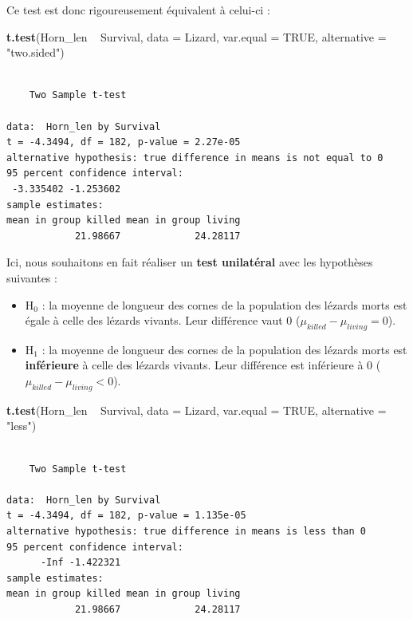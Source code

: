 \documentclass[a4paperpaper,]{article}
\newenvironment{Shaded}{\begin{snugshade}}{\end{snugshade}}
\newcommand{\DataTypeTok}[1]{\textcolor[rgb]{0.00,0.34,0.68}{#1}}
\newcommand{\KeywordTok}[1]{\textcolor[rgb]{0.12,0.11,0.11}{\textbf{#1}}}
\newcommand{\NormalTok}[1]{\textcolor[rgb]{0.12,0.11,0.11}{#1}}
\newcommand{\OperatorTok}[1]{\textcolor[rgb]{0.12,0.11,0.11}{#1}}
\newcommand{\OtherTok}[1]{\textcolor[rgb]{0.00,0.43,0.16}{#1}}
\newcommand{\StringTok}[1]{\textcolor[rgb]{0.75,0.01,0.01}{#1}}
\providecommand{\tightlist}{%
  \setlength{\itemsep}{0pt}\setlength{\parskip}{0pt}}
\begin{document}
Ce test est donc rigoureusement équivalent à celui-ci :

\begin{Shaded}
\begin{Highlighting}[]
\KeywordTok{t.test}\NormalTok{(Horn_len }\OperatorTok{~}\StringTok{ }\NormalTok{Survival, }
       \DataTypeTok{data =}\NormalTok{ Lizard, }\DataTypeTok{var.equal =} \OtherTok{TRUE}\NormalTok{,}
       \DataTypeTok{alternative =} \StringTok{"two.sided"}\NormalTok{)}
\end{Highlighting}
\end{Shaded}

\begin{verbatim}

    Two Sample t-test

data:  Horn_len by Survival
t = -4.3494, df = 182, p-value = 2.27e-05
alternative hypothesis: true difference in means is not equal to 0
95 percent confidence interval:
 -3.335402 -1.253602
sample estimates:
mean in group killed mean in group living 
            21.98667             24.28117 
\end{verbatim}

Ici, nous souhaitons en fait réaliser un \textbf{test unilatéral} avec les hypothèses suivantes :

\begin{itemize}
\tightlist
\item
  H\(_0\) : la moyenne de longueur des cornes de la population des lézards morts est égale à celle des lézards vivants. Leur différence vaut 0 (\(\mu_{killed}-\mu_{living} = 0\)).
\item
  H\(_1\) : la moyenne de longueur des cornes de la population des lézards morts est \textbf{inférieure} à celle des lézards vivants. Leur différence est inférieure à 0 (\(\mu_{killed}-\mu_{living} < 0\)).
\end{itemize}

\begin{Shaded}
\begin{Highlighting}[]
\KeywordTok{t.test}\NormalTok{(Horn_len }\OperatorTok{~}\StringTok{ }\NormalTok{Survival, }
       \DataTypeTok{data =}\NormalTok{ Lizard, }\DataTypeTok{var.equal =} \OtherTok{TRUE}\NormalTok{,}
       \DataTypeTok{alternative =} \StringTok{"less"}\NormalTok{)}
\end{Highlighting}
\end{Shaded}

\begin{verbatim}

    Two Sample t-test

data:  Horn_len by Survival
t = -4.3494, df = 182, p-value = 1.135e-05
alternative hypothesis: true difference in means is less than 0
95 percent confidence interval:
      -Inf -1.422321
sample estimates:
mean in group killed mean in group living 
            21.98667             24.28117 
\end{verbatim}
\end{document}
